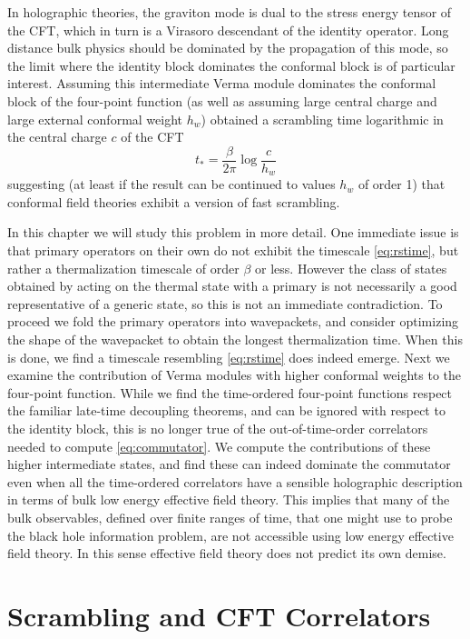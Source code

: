 \documentclass{brownthesis}
\begin{document}
In holographic theories, the graviton mode is dual to the stress energy
tensor of the CFT, which in turn is a Virasoro descendant of the identity
operator. Long distance bulk physics should be dominated by the propagation
of this mode, so the limit where the identity block dominates the
conformal block is of particular interest. Assuming this intermediate
Verma module dominates the conformal block of the four-point function
\cite{PhysRevLett.115.131603} (as well as assuming large central
charge and large external conformal weight $h_{w}$) obtained a scrambling
time logarithmic in the central charge $c$ of the CFT
\begin{equation}
t_{*}=\frac{\beta}{2\pi}\log\frac{c}{h_{w}}\label{eq:rstime}
\end{equation}
suggesting (at least if the result can be continued to values $h_{w}$
of order 1) that conformal field theories exhibit a version of fast
scrambling.

In this chapter we will study this problem in more detail. One immediate
issue is that primary operators on their own do not exhibit the timescale
\eqref{eq:rstime}, but rather a thermalization timescale of order
$\beta$ or less. However the class of states obtained by acting on
the thermal state with a primary is not necessarily a good representative
of a generic state, so this is not an immediate contradiction. To
proceed we fold the primary operators into wavepackets, and consider
optimizing the shape of the wavepacket to obtain the longest thermalization
time. When this is done, we find a timescale resembling \eqref{eq:rstime}
does indeed emerge. Next we examine the contribution of Verma modules
with higher conformal weights to the four-point function. While we
find the time-ordered four-point functions respect the familiar late-time
decoupling theorems, and can be ignored with respect to the identity
block, this is no longer true of the out-of-time-order correlators
needed to compute \eqref{eq:commutator}. We compute the contributions
of these higher intermediate states, and find these can indeed dominate
the commutator even when all the time-ordered correlators have a sensible
holographic description in terms of bulk low energy effective field
theory. This implies that many of the bulk observables, defined over
finite ranges of time, that one might use to probe the black hole
information problem, are not accessible using low energy effective
field theory. In this sense effective field theory does not predict
its own demise.

\section{Scrambling and CFT Correlators}
\end{document}
